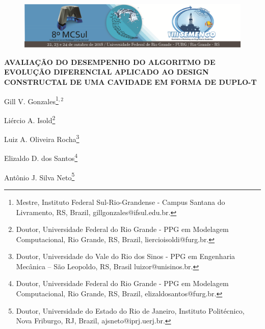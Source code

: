 \documentclass[12pt,A4,A4pt]{article}
\begin{document}

\begin{figure}
\centering
\vspace{-1cm}
\begin{minipage}[c]{\textwidth}
\centering
    \includegraphics[width=6.2in]{cabecalho.eps}
\end{minipage}
\end{figure}

\begin{center}
\fontsize{16pt}{\baselineskip}\selectfont 
\textbf{{AVALIAÇÃO DO DESEMPENHO DO ALGORITMO DE EVOLUÇÃO DIFERENCIAL APLICADO AO DESIGN CONSTRUCTAL DE UMA CAVIDADE EM FORMA DE DUPLO-T}}
\end{center}
\vspace{-0.9cm}

\begin{flushright}
Gill V. Gonzales\footnote{Mestre, Instituto Federal Sul-Rio-Grandense - Campus Santana do Livramento, RS, Brazil, gillgonzales@ifsul.edu.br.}$^{,2}$

Liércio A. Isold\footnote{Doutor, Universidade Federal do Rio Grande - PPG em Modelagem Computacional, Rio Grande, RS, Brazil, liercioisoldi@furg.br.}

Luiz A. Oliveira Rocha\footnote{Doutor, Universidade do Vale do Rio dos Sinos - PPG em Engenharia Mecânica – São Leopoldo, RS, Brasil luizor@unisinos.br.}

Elizaldo D. dos Santos\footnote{Doutor, Universidade Federal do Rio Grande - PPG em Modelagem Computacional, Rio Grande, RS, Brazil, elizaldosantos@furg.br.}

Antônio J. Silva Neto\footnote{Doutor, Universidade do Estado do Rio de Janeiro, Instituto Politécnico, Nova Friburgo, RJ, Brazil, ajsneto@iprj.uerj.br.}

\end{flushright}
\end{document}
